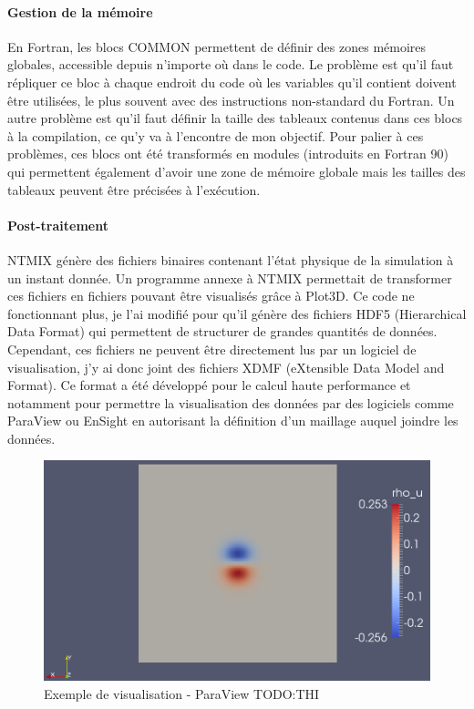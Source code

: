 
\paragraph{Gestion de la mémoire}En Fortran, les blocs COMMON permettent de définir des zones mémoires globales, accessible depuis n'importe où dans le code. Le problème est qu'il faut répliquer ce bloc à chaque endroit du code où les variables qu'il contient doivent être utilisées, le plus souvent avec des instructions non-standard du Fortran. Un autre problème est qu'il faut définir la taille des tableaux contenus dans ces blocs à la compilation, ce qu'y va à l'encontre de mon objectif. Pour palier à ces problèmes, ces blocs ont été transformés en modules (introduits en Fortran 90) qui permettent également d'avoir une zone de mémoire globale mais les tailles des tableaux peuvent être précisées à l'exécution.

\paragraph{Post-traitement}NTMIX génère des fichiers binaires contenant l'état physique de la simulation à un instant donnée. Un programme annexe à NTMIX permettait de transformer ces fichiers en fichiers pouvant être visualisés grâce à Plot3D. Ce code ne fonctionnant plus, je l'ai modifié pour qu'il génère des fichiers HDF5 (Hierarchical Data Format) qui permettent de structurer de grandes quantités de données. Cependant, ces fichiers ne peuvent être directement lus par un logiciel de visualisation, j'y ai donc joint des fichiers XDMF (eXtensible Data Model and Format). Ce format a été développé pour le calcul haute performance et notamment pour permettre la visualisation des données par des logiciels comme ParaView ou EnSight en autorisant la définition d'un maillage auquel joindre les données.


\begin{figure}[ht]
  \centering
  \includegraphics[scale=0.3]{figures/vertex.png}
  \caption{\label{fig:visu}Exemple de visualisation - ParaView TODO:THI}
\end{figure}

